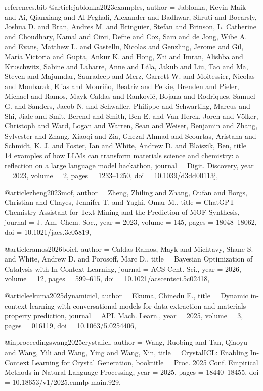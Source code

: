 \begin{filecontents*}[overwrite]{references.bib}
@article{jablonka2023examples,
  author = {Jablonka, Kevin Maik and Ai, Qianxiang and Al-Feghali, Alexander and Badhwar, Shruti and Bocarsly, Joshua D. and Bran, Andres M. and Bringuier, Stefan and Brinson, L. Catherine and Choudhary, Kamal and Circi, Defne and Cox, Sam and de Jong, Wibe A. and Evans, Matthew L. and Gastellu, Nicolas and Genzling, Jerome and Gil, María Victoria and Gupta, Ankur K. and Hong, Zhi and Imran, Alishba and Kruschwitz, Sabine and Labarre, Anne and Lála, Jakub and Liu, Tao and Ma, Steven and Majumdar, Sauradeep and Merz, Garrett W. and Moitessier, Nicolas and Moubarak, Elias and Mouriño, Beatriz and Pelkie, Brenden and Pieler, Michael and Ramos, Mayk Caldas and Ranković, Bojana and Rodriques, Samuel G. and Sanders, Jacob N. and Schwaller, Philippe and Schwarting, Marcus and Shi, Jiale and Smit, Berend and Smith, Ben E. and Van Herck, Joren and Völker, Christoph and Ward, Logan and Warren, Sean and Weiser, Benjamin and Zhang, Sylvester and Zhang, Xiaoqi and Zia, Ghezal Ahmad and Scourtas, Aristana and Schmidt, K. J. and Foster, Ian and White, Andrew D. and Blaiszik, Ben},
  title = {14 examples of how LLMs can transform materials science and chemistry: a reflection on a large language model hackathon},
  journal = {Digit. Discovery},
  year = {2023},
  volume = {2},
  pages = {1233--1250},
  doi = {10.1039/d3dd00113j},
}

@article{zheng2023mof,
  author = {Zheng, Zhiling and Zhang, Oufan and Borgs, Christian and Chayes, Jennifer T. and Yaghi, Omar M.},
  title = {ChatGPT Chemistry Assistant for Text Mining and the Prediction of MOF Synthesis},
  journal = {J. Am. Chem. Soc.},
  year = {2023},
  volume = {145},
  pages = {18048--18062},
  doi = {10.1021/jacs.3c05819},
}

@article{ramos2026boicl,
  author = {Caldas Ramos, Mayk and Michtavy, Shane S. and White, Andrew D. and Porosoff, Marc D.},
  title = {Bayesian Optimization of Catalysis with In-Context Learning},
  journal = {ACS Cent. Sci.},
  year = {2026},
  volume = {12},
  pages = {599--615},
  doi = {10.1021/acscentsci.5c02418},
}

@article{ekuma2025dynamicicl,
  author = {Ekuma, Chinedu E.},
  title = {Dynamic in-context learning with conversational models for data extraction and materials property prediction},
  journal = {APL Mach. Learn.},
  year = {2025},
  volume = {3},
  pages = {016119},
  doi = {10.1063/5.0254406},
}

@inproceedings{wang2025crystalicl,
  author = {Wang, Ruobing and Tan, Qiaoyu and Wang, Yili and Wang, Ying and Wang, Xin},
  title = {CrystalICL: Enabling In-Context Learning for Crystal Generation},
  booktitle = {Proc. 2025 Conf. Empirical Methods in Natural Language Processing},
  year = {2025},
  pages = {18440--18455},
  doi = {10.18653/v1/2025.emnlp-main.929},
}


\end{filecontents*}
